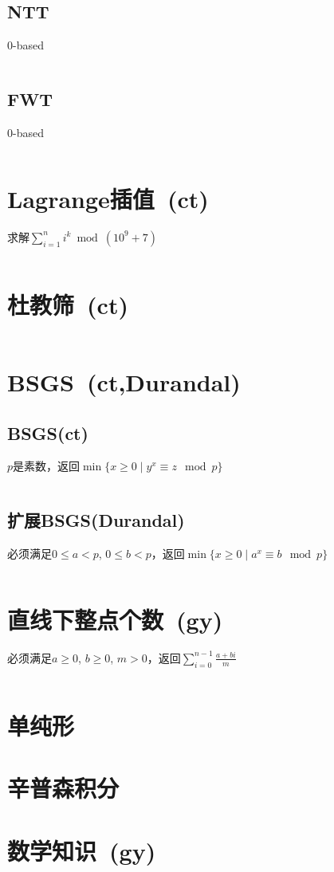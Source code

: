 	\subsection*{NTT}
		$ 0 $-based
		\inputminted{cpp}{Math/ntt.cpp}
	\subsection*{FWT}
		$ 0 $-based
		\inputminted{cpp}{Math/fwt.cpp}
\section{Lagrange插值\ \small(ct)}
	求解$ \sum\limits_{i = 1}^{n} i^k \bmod (10^9 + 7)$
	\inputminted{cpp}{Math/lagrange_polynomial.cpp}
\section{杜教筛\ \small(ct)}
	\inputminted{cpp}{Math/du_jiao_sieve.cpp}
\section{BSGS\ \small(ct,Durandal)}
	\subsection{BSGS(ct)}
		$ p $是素数，返回$ \min\lbrace x \geq 0 \mid y^x \equiv z \mod p \rbrace $
		\inputminted{cpp}{Math/bsgs.cpp}
	\subsection{扩展BSGS(Durandal)}
		必须满足$ 0 \leq a < p $, $ 0 \leq b < p $，返回$ \min\lbrace x \geq 0 \mid a^x \equiv b \mod p\rbrace $
		\inputminted{cpp}{Math/ex_bsgs.cpp}
\section{直线下整点个数\ \small(gy)}
	必须满足$ a \geq 0 $, $ b \geq 0 $, $ m > 0 $，返回$ \sum\limits_{i=0}^{n-1} \frac{a + bi}{m} $
	\inputminted{cpp}{Math/points_below_line.cpp}
\section{单纯形}
\section{辛普森积分}
\section{数学知识\ \small(gy)}
\newcommand{\eularian}{\genfrac\langle\rangle{0pt}{0}}
\newcommand{\Eularian}[2]{\left\langle\!\!\!\eularian{#1}{#2}\!\!\!\right\rangle}
